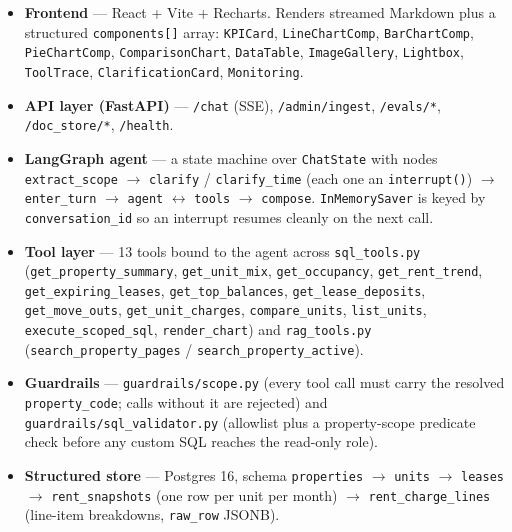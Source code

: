\documentclass[11pt,a4paper]{article}
\begin{document}
\begin{itemize}
  \item \textbf{Frontend} --- React + Vite + Recharts. Renders streamed Markdown plus a
  structured \texttt{components[]} array: \texttt{KPICard}, \texttt{LineChartComp},
  \texttt{BarChartComp}, \texttt{PieChartComp}, \texttt{ComparisonChart},
  \texttt{DataTable}, \texttt{ImageGallery}, \texttt{Lightbox}, \texttt{ToolTrace},
  \texttt{ClarificationCard}, \texttt{Monitoring}.

  \item \textbf{API layer (FastAPI)} --- \texttt{/chat} (SSE), \texttt{/admin/ingest},
  \texttt{/evals/*}, \texttt{/doc\_store/*}, \texttt{/health}.

  \item \textbf{LangGraph agent} --- a state machine over \texttt{ChatState} with nodes
  \texttt{extract\_scope} $\rightarrow$ \texttt{clarify} / \texttt{clarify\_time} (each one
  an \texttt{interrupt()}) $\rightarrow$ \texttt{enter\_turn} $\rightarrow$
  \texttt{agent} $\leftrightarrow$ \texttt{tools} $\rightarrow$ \texttt{compose}.
  \texttt{InMemorySaver} is keyed by \texttt{conversation\_id} so an interrupt resumes
  cleanly on the next call.

  \item \textbf{Tool layer} --- 13 tools bound to the agent across \texttt{sql\_tools.py}
  (\texttt{get\_property\_summary}, \texttt{get\_unit\_mix}, \texttt{get\_occupancy},
  \texttt{get\_rent\_trend}, \texttt{get\_expiring\_leases}, \texttt{get\_top\_balances},
  \texttt{get\_lease\_deposits}, \texttt{get\_move\_outs}, \texttt{get\_unit\_charges},
  \texttt{compare\_units}, \texttt{list\_units}, \texttt{execute\_scoped\_sql},
  \texttt{render\_chart}) and \texttt{rag\_tools.py} (\texttt{search\_property\_pages} /
  \texttt{search\_property\_active}).

  \item \textbf{Guardrails} --- \texttt{guardrails/scope.py} (every tool call must carry
  the resolved \texttt{property\_code}; calls without it are rejected) and
  \texttt{guardrails/sql\_validator.py} (allowlist plus a property-scope predicate check
  before any custom SQL reaches the read-only role).

  \item \textbf{Structured store} --- Postgres 16, schema
  \texttt{properties} $\rightarrow$ \texttt{units} $\rightarrow$ \texttt{leases}
  $\rightarrow$ \texttt{rent\_snapshots} (one row per unit per month)
  $\rightarrow$ \texttt{rent\_charge\_lines} (line-item breakdowns, \texttt{raw\_row} JSONB).


\end{itemize}
\end{document}
